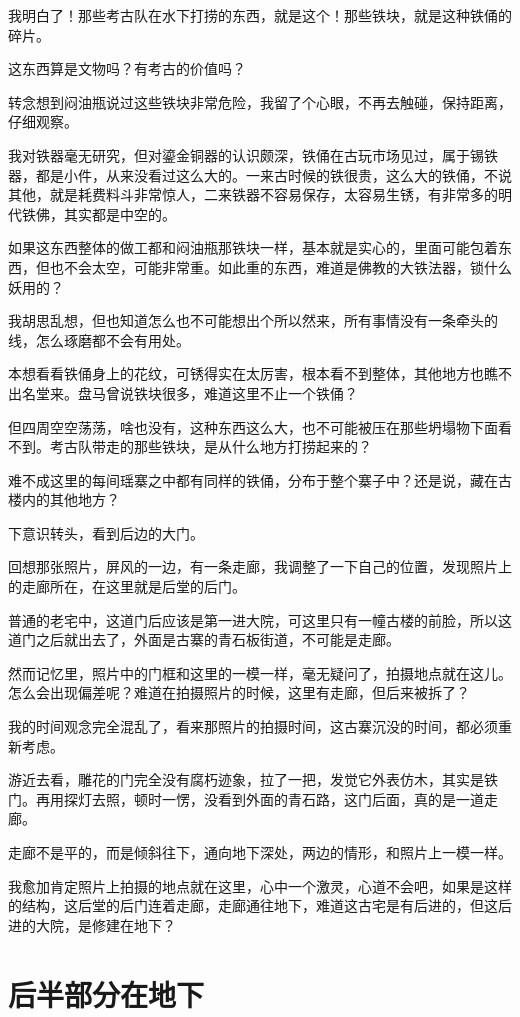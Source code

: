 我明白了！那些考古队在水下打捞的东西，就是这个！那些铁块，就是这种铁俑的碎片。

这东西算是文物吗？有考古的价值吗？

转念想到闷油瓶说过这些铁块非常危险，我留了个心眼，不再去触碰，保持距离，仔细观察。

我对铁器毫无研究，但对鎏金铜器的认识颇深，铁俑在古玩市场见过，属于锡铁器，都是小件，从来没看过这么大的。一来古时候的铁很贵，这么大的铁俑，不说其他，就是耗费料斗非常惊人，二来铁器不容易保存，太容易生锈，有非常多的明代铁佛，其实都是中空的。

如果这东西整体的做工都和闷油瓶那铁块一样，基本就是实心的，里面可能包着东西，但也不会太空，可能非常重。如此重的东西，难道是佛教的大铁法器，锁什么妖用的？

我胡思乱想，但也知道怎么也不可能想出个所以然来，所有事情没有一条牵头的线，怎么琢磨都不会有用处。

本想看看铁俑身上的花纹，可锈得实在太厉害，根本看不到整体，其他地方也瞧不出名堂来。盘马曾说铁块很多，难道这里不止一个铁俑？

但四周空空荡荡，啥也没有，这种东西这么大，也不可能被压在那些坍塌物下面看不到。考古队带走的那些铁块，是从什么地方打捞起来的？

难不成这里的每间瑶寨之中都有同样的铁俑，分布于整个寨子中？还是说，藏在古楼内的其他地方？

下意识转头，看到后边的大门。

回想那张照片，屏风的一边，有一条走廊，我调整了一下自己的位置，发现照片上的走廊所在，在这里就是后堂的后门。

普通的老宅中，这道门后应该是第一进大院，可这里只有一幢古楼的前脸，所以这道门之后就出去了，外面是古寨的青石板街道，不可能是走廊。

然而记忆里，照片中的门框和这里的一模一样，毫无疑问了，拍摄地点就在这儿。怎么会出现偏差呢？难道在拍摄照片的时候，这里有走廊，但后来被拆了？

我的时间观念完全混乱了，看来那照片的拍摄时间，这古寨沉没的时间，都必须重新考虑。

游近去看，雕花的门完全没有腐朽迹象，拉了一把，发觉它外表仿木，其实是铁门。再用探灯去照，顿时一愣，没看到外面的青石路，这门后面，真的是一道走廊。

走廊不是平的，而是倾斜往下，通向地下深处，两边的情形，和照片上一模一样。

我愈加肯定照片上拍摄的地点就在这里，心中一个激灵，心道不会吧，如果是这样的结构，这后堂的后门连着走廊，走廊通往地下，难道这古宅是有后进的，但这后进的大院，是修建在地下？

\chapter{后半部分在地下}

